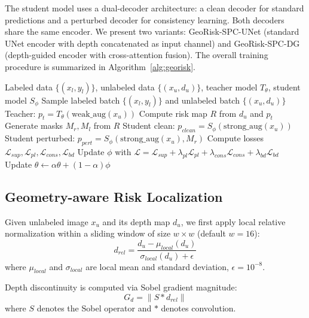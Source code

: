 \documentclass[conference]{IEEEtran}
\begin{document}
The student model uses a dual-decoder architecture: a clean decoder for standard predictions and a perturbed decoder for consistency learning. Both decoders share the same encoder. We present two variants: GeoRisk-SPC-UNet (standard UNet encoder with depth concatenated as input channel) and GeoRisk-SPC-DG (depth-guided encoder with cross-attention fusion). The overall training procedure is summarized in Algorithm~\ref{alg:georisk}.

\begin{algorithm}[t]
\caption{GeoRisk-SPC Training (Geometry-conditioned Pseudo-label Risk Supervision)}
\label{alg:georisk}
\begin{algorithmic}[1]
\REQUIRE Labeled data $\{(x_l, y_l)\}$, unlabeled data $\{(x_u, d_u)\}$, teacher model $T_\theta$, student model $S_\phi$
    \STATE Sample labeled batch $\{(x_l, y_l)\}$ and unlabeled batch $\{(x_u, d_u)\}$
    \STATE Teacher: $p_t = T_\theta(\text{weak\_aug}(x_u))$ 
    \STATE Compute risk map $R$ from $d_u$ and $p_t$ 
    \STATE Generate masks $M_r, M_l$ from $R$ 
    \STATE Student clean: $p_{clean} = S_\phi(\text{strong\_aug}(x_u))$
    \STATE Student perturbed: $p_{pert} = S_\phi(\text{strong\_aug}(x_u), M_r)$
    \STATE Compute losses $\mathcal{L}_{sup}, \mathcal{L}_{pl}, \mathcal{L}_{cons}, \mathcal{L}_{bd}$
    \STATE Update $\phi$ with $\mathcal{L} = \mathcal{L}_{sup} + \lambda_{pl}\mathcal{L}_{pl} + \lambda_{cons}\mathcal{L}_{cons} + \lambda_{bd}\mathcal{L}_{bd}$
    \STATE Update $\theta \leftarrow \alpha\theta + (1-\alpha)\phi$ 
\ENDWHILE
\end{algorithmic}
\end{algorithm}

\subsection{Geometry-aware Risk Localization}

Given unlabeled image $x_u$ and its depth map $d_u$, we first apply local relative normalization within a sliding window of size $w \times w$ (default $w=16$):
\begin{equation}
d_{rel} = \frac{d_u - \mu_{local}(d_u)}{\sigma_{local}(d_u) + \epsilon}
\end{equation}
where $\mu_{local}$ and $\sigma_{local}$ are local mean and standard deviation, $\epsilon=10^{-8}$.

Depth discontinuity is computed via Sobel gradient magnitude:
\begin{equation}
G_d = \|S * d_{rel}\|
\end{equation}
where $S$ denotes the Sobel operator and $*$ denotes convolution.
\end{document}
